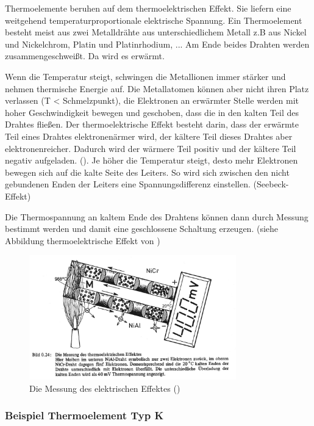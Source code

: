 \documentclass[12pt]{article}
\begin{document}
Thermoelemente beruhen auf dem thermoelektrischen Effekt. Sie liefern eine weitgehend  temperaturproportionale elektrische Spannung. Ein Thermoelement besteht meist aus zwei Metalldrähte aus unterschiedlichem Metall z.B aus Nickel und Nickelchrom, Platin und Platinrhodium, ... Am Ende beides Drahten werden zusammengeschweißt. Da wird es erwärmt.

Wenn die Temperatur steigt, schwingen die Metallionen immer stärker und nehmen thermische Energie auf. Die Metallatomen können aber nicht ihren Platz verlassen (T < Schmelzpunkt), die Elektronen an erwärmter Stelle werden mit hoher Geschwindigkeit bewegen und geschoben, dass die in den kalten Teil des Drahtes fließen. Der thermoelektrische Effekt besteht darin, dass der erwärmte Teil eines Drahtes elektronenärmer wird, der kältere Teil dieses Drahtes aber elektronenreicher. Dadurch wird der wärmere Teil positiv und der kältere Teil negativ aufgeladen. (\cite{L.v.Kortvelyessy.1987}). Je höher die Temperatur steigt, desto mehr Elektronen bewegen sich auf die kalte Seite des Leiters. So wird sich zwischen den nicht gebundenen Enden der Leiters eine Spannungsdifferenz einstellen. (Seebeck-Effekt)

Die Thermospannung an kaltem Ende des Drahtens können dann durch Messung bestimmt werden und damit eine geschlossene Schaltung erzeugen. (siehe Abbildung thermoelektrische Effekt von \cite{L.v.Kortvelyessy.1987})

\begin{figure}[h]
  \centering
  \label{fig:thermoelektrischerEffekt}
  \includegraphics[width=0.8\textwidth]{thermoelektrischerEffekt}
  \caption{Die Messung des elektrischen Effektes (\cite{L.v.Kortvelyessy.1987})}
\end{figure}

\subsubsection{Beispiel Thermoelement Typ K}
\end{document}
